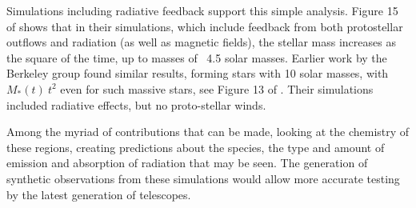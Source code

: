 \documentclass[../dissertation.tex]{subfiles}
\begin{document}
%

Simulations including radiative feedback support this simple analysis. 
Figure 15 of  \citet{2014MNRAS.439.3420M} shows that in their simulations, 
which include feedback from both protostellar outflows and radiation (as well as magnetic fields), 
the stellar mass increases as the square of the time, up to masses of ~4.5 solar masses. 
Earlier work by the Berkeley group found similar results, forming stars with 10 solar masses, 
with $M_*(t)~ t^2$ even for such massive stars, see Figure 13 of \citet{2012ApJ...754...71K}. 
Their simulations included radiative effects, but no proto-stellar winds. 

Among the myriad of contributions that can be made, looking at the chemistry of these regions, 
creating predictions about the species, the type and amount of emission and absorption of radiation that may be seen. 
The generation of synthetic observations from these simulations would allow more accurate testing by the latest generation of telescopes.
\end{document}
